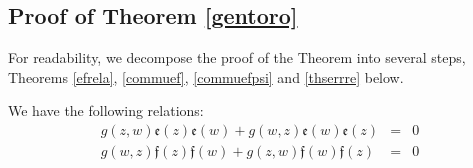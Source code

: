 \subsection{Proof of Theorem \ref{gentoro}}

For readability, we decompose the proof of the Theorem into several steps, Theorems \ref{efrela}, \ref{commuef}, 
\ref{commuefpsi} and \ref{thserrre} below.

\begin{thm}\label{efrela}
We have the following relations:
\begin{eqnarray*}
g(z,w){\mathfrak e}(z){\mathfrak e}(w)+g(w,z){\mathfrak e}(w){\mathfrak e}(z)&=&0\\
g(w,z){\mathfrak f}(z){\mathfrak f}(w)+g(z,w){\mathfrak f}(w){\mathfrak f}(z)&=&0
\end{eqnarray*}
\end{thm}
